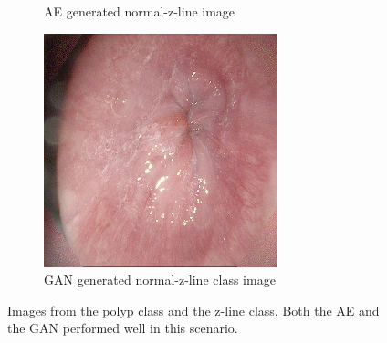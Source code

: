 \begin{figure}
\begin{subfigure}[t]{\myfigsizethree}
            \caption{AE generated normal-z-line image }   
            \label{fig:z_AE_CORNER1}
        \end{subfigure}
        \qquad%
        \begin{subfigure}[t]{\myfigsizethree}   
            \centering 
            \includegraphics[width=\textwidth]{experiments/figures/blackcorner/zGAN.jpg}
            \caption{GAN generated normal-z-line class image}    
            \label{fig:z_GAN_CORNER1}
        \end{subfigure}
        \caption{Images from the polyp class and the z-line class. Both the AE and the GAN performed well in this scenario.} 
        \label{fig:AE_GAN_CORNER1}
\end{figure}
    
